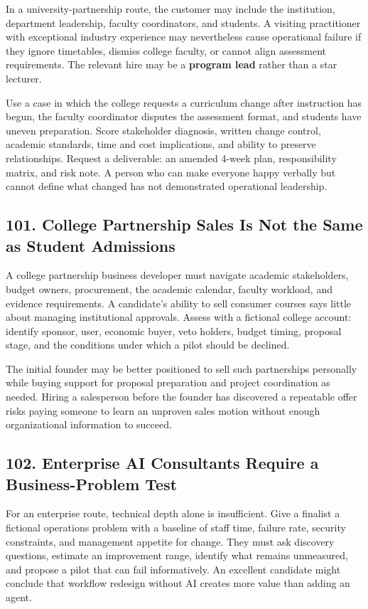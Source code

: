 In a university-partnership route, the customer may include the institution, department leadership, faculty coordinators, and students. A visiting practitioner with exceptional industry experience may nevertheless cause operational failure if they ignore timetables, dismiss college faculty, or cannot align assessment requirements. The relevant hire may be a \textbf{program lead} rather than a star lecturer.

Use a case in which the college requests a curriculum change after instruction has begun, the faculty coordinator disputes the assessment format, and students have uneven preparation. Score stakeholder diagnosis, written change control, academic standards, time and cost implications, and ability to preserve relationships. Request a deliverable: an amended 4-week plan, responsibility matrix, and risk note. A person who can make everyone happy verbally but cannot define what changed has not demonstrated operational leadership.

\subsection*{101. College Partnership Sales Is Not the Same as Student Admissions}

A college partnership business developer must navigate academic stakeholders, budget owners, procurement, the academic calendar, faculty workload, and evidence requirements. A candidate's ability to sell consumer courses says little about managing institutional approvals. Assess with a fictional college account: identify sponsor, user, economic buyer, veto holders, budget timing, proposal stage, and the conditions under which a pilot should be declined.

The initial founder may be better positioned to sell such partnerships personally while buying support for proposal preparation and project coordination as needed. Hiring a salesperson before the founder has discovered a repeatable offer risks paying someone to learn an unproven sales motion without enough organizational information to succeed.

\subsection*{102. Enterprise AI Consultants Require a Business-Problem Test}

For an enterprise route, technical depth alone is insufficient. Give a finalist a fictional operations problem with a baseline of staff time, failure rate, security constraints, and management appetite for change. They must ask discovery questions, estimate an improvement range, identify what remains unmeasured, and propose a pilot that can fail informatively. An excellent candidate might conclude that workflow redesign without AI creates more value than adding an agent.

